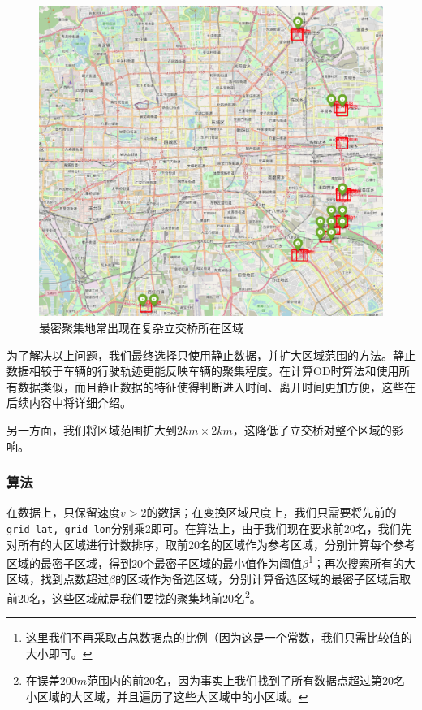 \documentclass[UTF8]{ctexart}
\begin{document}
\begin{figure}[!htb]
    \centering
    \includegraphics[width = \textwidth]{../img/立交桥.png}
    \caption{最密聚集地常出现在复杂立交桥所在区域}
    \label{bridge}    
\end{figure}

为了解决以上问题，我们最终选择只使用静止数据，并扩大区域范围的方法。静止数据相较于车辆的行驶轨迹更能反映车辆的聚集程度。在计算OD时算法和使用所有数据类似，而且静止数据的特征使得判断进入时间、离开时间更加方便，这些在后续内容中将详细介绍。

另一方面，我们将区域范围扩大到$2km\times 2km$，这降低了立交桥对整个区域的影响。

\subsubsection{算法}

在数据上，只保留速度$v>2$的数据；在变换区域尺度上，我们只需要将先前的\texttt{grid\_lat, grid\_lon}分别乘2即可。在算法上，由于我们现在要求前20名，我们先对所有的大区域进行计数排序，取前20名的区域作为参考区域，分别计算每个参考区域的最密子区域，得到20个最密子区域的最小值作为阈值$\beta$\footnote{这里我们不再采取占总数据点的比例（因为这是一个常数，我们只需比较值的大小即可。}；再次搜索所有的大区域，找到点数超过$\beta$的区域作为备选区域，分别计算备选区域的最密子区域后取前20名，这些区域就是我们要找的聚集地前20名\footnote{在误差$200m$范围内的前20名，因为事实上我们找到了所有数据点超过第20名小区域的大区域，并且遍历了这些大区域中的小区域。}。
\end{document}
